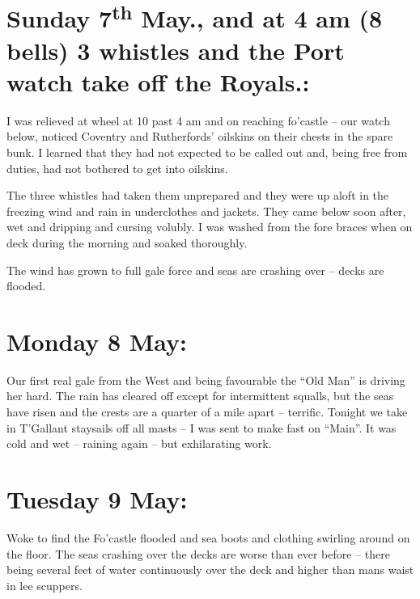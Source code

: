 \documentclass[
  11pt,
  msmallroyalvopaper
]{memoir}
\begin{document}
\hypertarget{sunday-7th-may.-and-at-4-am-8-bells-3-whistles-and-the-port-watch-take-off-the-royals.}{%
\section{\texorpdfstring{Sunday 7\textsuperscript{th} May., and at 4 am
(8 bells) 3 whistles and the Port watch take off the
Royals.:}{Sunday 7th May., and at 4 am (8 bells) 3 whistles and the Port watch take off the Royals.:}}\label{sunday-7th-may.-and-at-4-am-8-bells-3-whistles-and-the-port-watch-take-off-the-royals.}}

I was relieved at wheel at 10 past 4 am and on reaching fo'castle -- our
watch below, noticed Coventry and Rutherfords' oilskins on their chests
in the spare bunk. I learned that they had not expected to be called out
and, being free from duties, had not bothered to get into oilskins.

The three whistles had taken them unprepared and they were up aloft in
the freezing wind and rain in underclothes and jackets. They came below
soon after, wet and dripping and cursing volubly. I was washed from the
fore braces when on deck during the morning and soaked thoroughly.

The wind has grown to full gale force and seas are crashing over --
decks are flooded.

\hypertarget{monday-8-may}{%
\section{Monday 8 May:}\label{monday-8-may}}

Our first real gale from the West and being favourable the ``Old Man''
is driving her hard. The rain has cleared off except for intermittent
squalls, but the seas have risen and the crests are a quarter of a mile
apart -- terrific. Tonight we take in T'Gallant staysails off all masts
-- I was sent to make fast on ``Main''. It was cold and wet -- raining
again -- but exhilarating work.

\hypertarget{tuesday-9-may}{%
\section{Tuesday 9 May:}\label{tuesday-9-may}}

Woke to find the Fo'castle flooded and sea boots and clothing swirling
around on the floor. The seas crashing over the decks are worse than
ever before -- there being several feet of water continuously over the
deck and higher than mans waist in lee scuppers.
\end{document}
